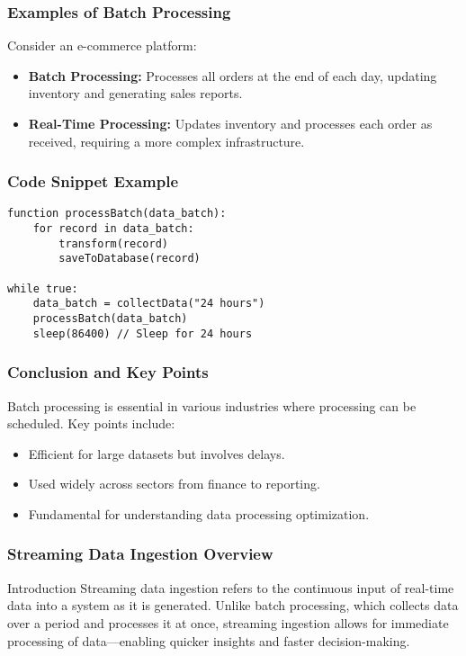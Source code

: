 \documentclass[aspectratio=169]{beamer}
\begin{document}
\begin{frame}[fragile]
    \frametitle{Examples of Batch Processing}
    Consider an e-commerce platform:
    \begin{itemize}
        \item \textbf{Batch Processing:} Processes all orders at the end of each day, updating inventory and generating sales reports.
        \item \textbf{Real-Time Processing:} Updates inventory and processes each order as received, requiring a more complex infrastructure.
    \end{itemize}
\end{frame}

\begin{frame}[fragile]
    \frametitle{Code Snippet Example}
    \begin{lstlisting}[language=pseudocode]
function processBatch(data_batch):
    for record in data_batch:
        transform(record)
        saveToDatabase(record)
        
while true:
    data_batch = collectData("24 hours")
    processBatch(data_batch)
    sleep(86400) // Sleep for 24 hours
    \end{lstlisting}
\end{frame}

\begin{frame}[fragile]
    \frametitle{Conclusion and Key Points}
    Batch processing is essential in various industries where processing can be scheduled. 
    Key points include:
    \begin{itemize}
        \item Efficient for large datasets but involves delays.
        \item Used widely across sectors from finance to reporting.
        \item Fundamental for understanding data processing optimization.
    \end{itemize}
\end{frame}

\begin{frame}[fragile]
    \frametitle{Streaming Data Ingestion Overview}
    \begin{block}{Introduction}
        Streaming data ingestion refers to the continuous input of real-time data into a system as it is generated. Unlike batch processing, which collects data over a period and processes it at once, streaming ingestion allows for immediate processing of data—enabling quicker insights and faster decision-making.
    \end{block}
\end{frame}
\end{document}
